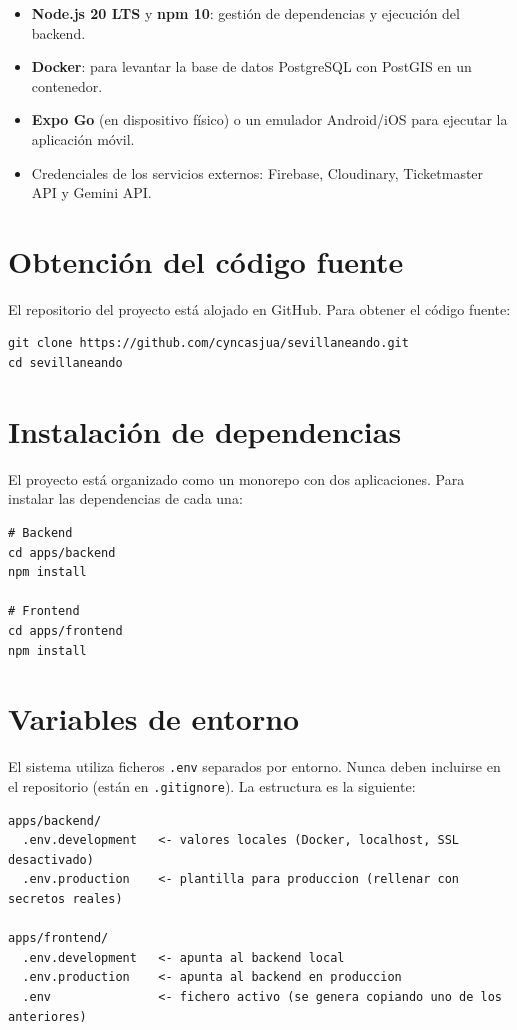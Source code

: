 \begin{itemize}
    \item \textbf{Node.js 20 LTS} y \textbf{npm 10}: gestión de dependencias y ejecución del backend.
    \item \textbf{Docker}: para levantar la base de datos PostgreSQL con PostGIS en un contenedor.
    \item \textbf{Expo Go} (en dispositivo físico) o un emulador Android/iOS para ejecutar la aplicación móvil.
    \item Credenciales de los servicios externos: Firebase, Cloudinary, Ticketmaster API y Gemini API.
\end{itemize}

\section{Obtención del código fuente}

El repositorio del proyecto está alojado en GitHub. Para obtener el código fuente:

\begin{lstlisting}
git clone https://github.com/cyncasjua/sevillaneando.git
cd sevillaneando
\end{lstlisting}

\section{Instalación de dependencias}

El proyecto está organizado como un monorepo con dos aplicaciones. Para instalar las dependencias de cada una:

\begin{lstlisting}
# Backend
cd apps/backend
npm install

# Frontend
cd apps/frontend
npm install
\end{lstlisting}

\section{Variables de entorno}

El sistema utiliza ficheros \texttt{.env} separados por entorno. Nunca deben incluirse en el repositorio (están en \texttt{.gitignore}). La estructura es la siguiente:

\begin{verbatim}
apps/backend/
  .env.development   <- valores locales (Docker, localhost, SSL desactivado)
  .env.production    <- plantilla para produccion (rellenar con secretos reales)

apps/frontend/
  .env.development   <- apunta al backend local
  .env.production    <- apunta al backend en produccion
  .env               <- fichero activo (se genera copiando uno de los anteriores)
\end{verbatim}


